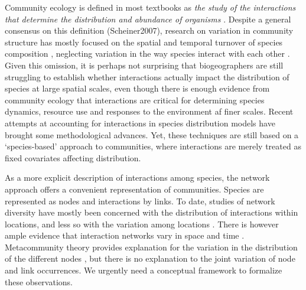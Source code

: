 \documentclass[12pt]{article}
\begin{document}
Community ecology is defined in most textbooks as \textit{the study of the
interactions that determine the distribution and abundance of organisms}
\citep{Krebs2001}. Despite a general consensus on this definition
(Scheiner2007), research on variation in community
structure has mostly focused on the spatial and temporal turnover of species composition
\citep{Anderson2011}, neglecting variation in the way species interact with
each other \citep{Poisot2015a}. Given this omission, it is perhaps not
surprising that biogeographers are still struggling to establish whether
interactions actually impact the distribution of species at large spatial
scales\citep{Wisz2012, Kissling2012}, even though there is enough evidence
from community ecology that interactions are critical for determining species
dynamics, resource use and responses to the environment af finer scales.
Recent attempts at accounting for interactions in species distribution models
\citep{Pollock2014, Pelissier2013} have brought some methodological advances.
Yet, these techniques are still based on a `species-based' approach to
communities, where interactions are merely treated as fixed covariates
affecting distribution.

As a more explicit description of interactions among species, the
network approach offers a convenient representation of communities. Species
are represented as nodes and interactions by links. To date, studies of
network diversity have mostly been concerned with the distribution of
interactions within locations, and less so with the variation among locations
\citep{Dunne2005, Bascompte2007, Ings2007, Kefi2012}. There is however 
ample evidence that interaction networks vary in space and time
\citep{Laliberte2010, Poisot2012, Albouy2014, Poisot2016, Trojelsgaard2015}. Metacommunity
theory provides explanation for the variation in the distribution of the
different nodes \citep{Gravel2011c, Pillai2011}, but there is no explanation
to the joint variation of node and link occurrences. We urgently need a
conceptual framework to formalize these observations.
\end{document}
